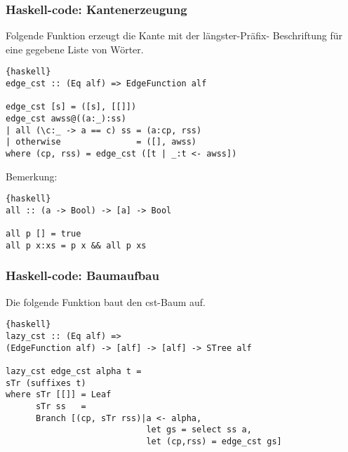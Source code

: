 \documentclass{beamer}
\begin{document}

\begin{frame}[fragile]
\frametitle{Haskell-code: Kantenerzeugung}
Folgende Funktion erzeugt die Kante mit der längster-Präfix- Beschriftung für eine gegebene Liste von Wörter.
\begin{lstlisting}{haskell}
edge_cst :: (Eq alf) => EdgeFunction alf

edge_cst [s] = ([s], [[]])
edge_cst awss@((a:_):ss) 
| all (\c:_ -> a == c) ss = (a:cp, rss)
| otherwise               = ([], awss)
where (cp, rss) = edge_cst ([t | _:t <- awss])
\end{lstlisting}
\bigskip
Bemerkung:
\begin{lstlisting}{haskell}
all :: (a -> Bool) -> [a] -> Bool

all p [] = true
all p x:xs = p x && all p xs
\end{lstlisting} 
\end{frame}


\begin{frame}[fragile]
\frametitle{Haskell-code: Baumaufbau}
Die folgende Funktion baut den cst-Baum auf.
\begin{lstlisting}{haskell}
lazy_cst :: (Eq alf) => 
(EdgeFunction alf) -> [alf] -> [alf] -> STree alf

lazy_cst edge_cst alpha t = 
sTr (suffixes t)
where sTr [[]] = Leaf
      sTr ss   = 
      Branch [(cp, sTr rss)|a <- alpha,
                            let gs = select ss a,
                            let (cp,rss) = edge_cst gs]
\end{lstlisting}
\end{frame}
\end{document}
